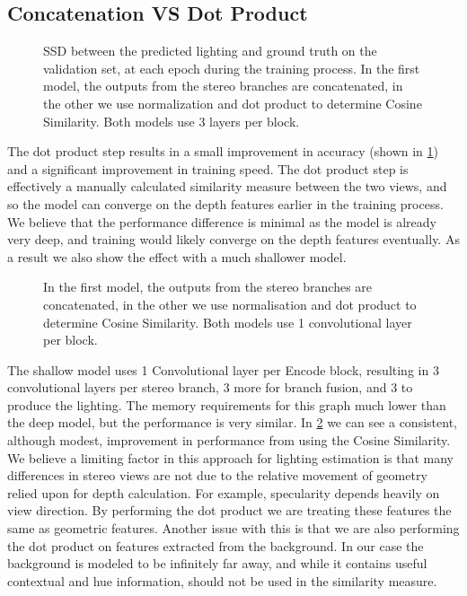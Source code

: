 \documentclass[ %
                    author={Gavin Parker},
                supervisor={Dr. Neill Campbell},
                    degree={MEng},
                     title={Deep Learning for Illumination Estimation from Stereo Images},
                  subtitle={},
                      type={Research},
                      year={2018} ]{dissertation}
\begin{document}
\subsection{Concatenation VS Dot Product}
\begin{figure}[H]
\setlength\figureheight{6cm}
\setlength\figurewidth{12cm}
\centering

\caption{SSD between the predicted lighting and ground truth on the validation set, at each epoch during the training process. In the first model, the outputs from the stereo branches are concatenated, in the other we use normalization and dot product to determine Cosine Similarity. Both models use 3 layers per block.}
\label{fig:dotprod_comp2}
\end{figure}
The dot product step results in a small improvement in accuracy (shown in \ref{fig:dotprod_comp2}) and a significant improvement in training speed. The dot product step is effectively a manually calculated similarity measure between the two views, and so the model can converge on the depth features earlier in the training process. We believe that the performance difference is minimal as the model is already very deep, and training would likely converge on the depth features eventually.
As a result we also show the effect with a much shallower model.
\begin{figure}[H]
\setlength\figureheight{6cm}
\setlength\figurewidth{12cm}
\centering

\caption{In the first model, the outputs from the stereo branches are concatenated, in the other we use normalisation and dot product to determine Cosine Similarity. Both models use 1 convolutional layer per block.}
\label{fig:dotprod_comp}
\end{figure}
The shallow model uses 1 Convolutional layer per Encode block, resulting in 3 convolutional layers per stereo branch, 3 more for branch fusion, and 3 to produce the lighting. The memory requirements for this graph much lower than the deep model, but the performance is very similar. In \ref{fig:dotprod_comp} we can see a consistent, although modest, improvement in performance from using the Cosine Similarity. We believe a limiting factor in this approach for lighting estimation is that many differences in stereo views are not due to the relative movement of geometry relied upon for depth calculation. For example, specularity depends heavily on view direction. By performing the dot product we are treating these features the same as geometric features.
\newline
Another issue with this is that we are also performing the dot product on features extracted from the background. In our case the background is modeled to be infinitely far away, and while it contains useful contextual and hue information, should not be used in the similarity measure.
\end{document}
